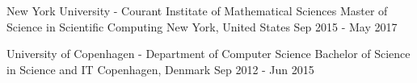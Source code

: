 

\begin{cventries}

  \cventryedu
    {New York University - Courant Institate of Mathematical Sciences} %
    {Master of Science in Scientific Computing} %
    {New York, United States} %
    {Sep 2015 - May 2017}

  \cventryedu
    {University of Copenhagen - Department of Computer Science} %
    {Bachelor of Science in Science and IT} %
    {Copenhagen, Denmark} %
    {Sep 2012 - Jun 2015}

\end{cventries}
